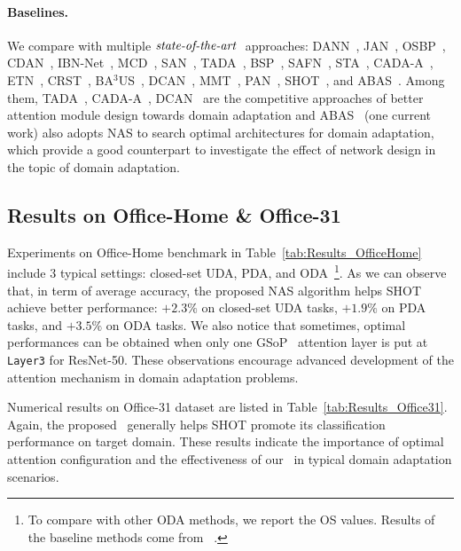 \documentclass[10pt,twocolumn,letterpaper]{article}
\begin{document}
\paragraph{Baselines.}
We compare with multiple $\textit{state-of-the-art}~$ approaches: DANN~\cite{ganin2015DANN}, JAN~\cite{long2017JAN}, OSBP~\cite{saito2018OSBP}, CDAN~\cite{long2018CDAN}, IBN-Net~\cite{pan2018IBNNet}, MCD~\cite{saito2018MCD}, SAN~\cite{cao2018SAN}, TADA~\cite{wang2019TADA}, BSP~\cite{chen2019BSP}, SAFN~\cite{xu2019SAFN}, STA~\cite{liu2019STA}, CADA-A~\cite{kurmi2019CADA}, ETN~\cite{cao2019ETN}, CRST~\cite{zou2019CRST}, BA$^{3}$US~\cite{liang2020BA3US}, DCAN~\cite{li2020DCAN}, MMT~\cite{ge2020MMT}, PAN~\cite{wang2020PAN}, SHOT~\cite{liang2020shot}, and ABAS~\cite{robbiano2021adversarial}. Among them, TADA~\cite{wang2019TADA}, CADA-A~\cite{kurmi2019CADA}, DCAN~\cite{li2020DCAN} are the competitive approaches of better attention module design towards domain adaptation and ABAS~\cite{robbiano2021adversarial} (one current work) also adopts NAS to search optimal architectures for domain adaptation, which provide a good counterpart to investigate the effect of network design in the topic of domain adaptation.

\subsection{Results on Office-Home \& Office-31}
Experiments on Office-Home benchmark in Table~\ref{tab:Results_OfficeHome} include $3$ typical settings: closed-set UDA, PDA, and ODA~\footnote{To compare with other ODA methods, we report the OS values. Results of the baseline methods come from ~\cite{liang2020shot}.}.
As we can observe that, in term of average accuracy, the proposed NAS algorithm helps SHOT achieve better performance: $+2.3\%$ on closed-set UDA tasks, $+1.9\%$ on PDA tasks, and $+3.5\%$ on ODA tasks. We also notice that sometimes, optimal performances can be obtained when only one GSoP~\cite{gao2019GSoP} attention layer is put at \texttt{Layer3} for ResNet-50. These observations encourage advanced development of the attention mechanism in domain adaptation problems.






Numerical results on Office-31 dataset are listed in Table~\ref{tab:Results_Office31}.
Again, the proposed \iMethod\, generally helps SHOT promote its classification performance on target domain. These results indicate the importance of optimal attention configuration and the effectiveness of our \iMethod\, in typical domain adaptation scenarios.
\end{document}
